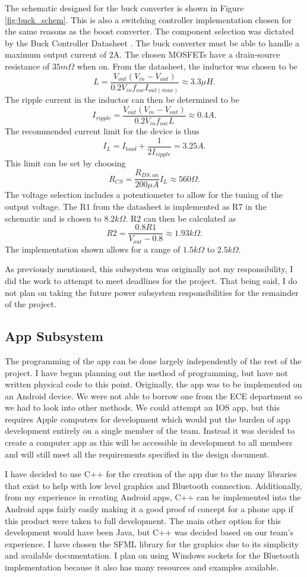 \documentclass[12pt]{article}
\begin{document}
The schematic designed for the buck converter is shown in Figure \ref{fig:buck_schem}. This is also a switching controller implementation chosen for the same reasons as the boost converter. The component selection was dictated by the Buck Controller Datasheet \cite{buck}. The buck converter must be able to handle a maximum output current of 2A. The chosen MOSFETs have a drain-source resistance of $35m\Omega$ when on. From the datasheet, the inductor was chosen to be
\[ L = \frac{V_{out}(V_{in} - V_{out})}{0.2V_{in}f_{osc}I_{out(max)}} \approx 3.3\mu H. \]
The ripple current in the inductor can then be determined to be
\[ I_{ripple} = \frac{V_{out}(V_{in} - V_{out})}{0.2V_{in}f_{osc}L} \approx 0.4A. \]
The recommended current limit for the device is thus
\[ I_L = I_{load} + \frac{1}{2I_{ripple}} = 3.25A. \]
This limit can be set by choosing
\[ R_{CS} = \frac{R_{DS,on}}{200\mu A}I_L \approx 560\Omega. \]
The voltage selection includes a potentiometer to allow for the tuning of the output voltage. The R1 from the datasheet is implemented as R7 in the schematic and is chosen to $8.2k\Omega$. R2 can then be calculated as
\[ R2 = \frac{0.8R1}{V_{out} - 0.8} \approx 1.93k\Omega. \]
The implementation shown allows for a range of $1.5k\Omega$ to $2.5k\Omega$.

As previously mentioned, this subsystem was originally not my responsibility, I did the work to attempt to meet deadlines for the project. That being said, I do not plan on taking the future power subsystem responsibilities for the remainder of the project.

\subsection{App Subsystem}

The programming of the app can be done largely independently of the rest of the project. I have begun planning out the method of programming, but have not written physical code to this point. Originally, the app was to be implemented on an Android device. We were not able to borrow one from the ECE department so we had to look into other methods. We could attempt an IOS app, but this requires Apple computers for development which would put the burden of app development entirely on a single member of the team. Instead it was decided to create a computer app as this will be accessible in development to all members and will still meet all the requirements specified in the design document.

I have decided to use C++ for the creation of the app due to the many libraries that exist to help with low level graphics and Bluetooth connection. Additionally, from my experience in creating Android apps, C++ can be implemented into the Android apps fairly easily making it a good proof of concept for a phone app if this product were taken to full development. The main other option for this development would have been Java, but C++ was decided based on our team's experience. I have chosen the SFML library for the graphics due to its simplicity and available documentation. I plan on using Windows sockets for the Bluetooth implementation because it also has many resources and examples available.
\end{document}
